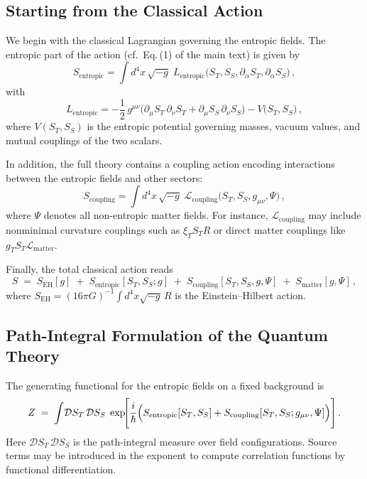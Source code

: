 \documentclass[11pt,a4paper]{article} %
\begin{document}
\subsection{Starting from the Classical Action}
We begin with the classical Lagrangian governing the entropic fields.  The entropic part of the action (cf.\ Eq.\,(1) of the main text) is given by
\begin{equation}
S_{\mathrm{entropic}}
=\int d^4x\,\sqrt{-g}\;L_{\mathrm{entropic}}\bigl(S_T,S_S,\partial_\alpha S_T,\partial_\alpha S_S\bigr)\,,
\end{equation}
with
\begin{equation}
L_{\mathrm{entropic}}
=-\frac{1}{2}\,g^{\mu\nu}\bigl(\partial_\mu S_T\,\partial_\nu S_T+\partial_\mu S_S\,\partial_\nu S_S\bigr)
-V\bigl(S_T,S_S\bigr)\,,
\end{equation}
where \(V(S_T,S_S)\) is the entropic potential governing masses, vacuum values, and mutual couplings of the two scalars.

In addition, the full theory contains a coupling action encoding interactions between the entropic fields and other sectors:
\begin{equation}
S_{\mathrm{coupling}}
=\int d^4x\,\sqrt{-g}\;\mathcal{L}_{\mathrm{coupling}}\bigl(S_T,S_S,g_{\mu\nu},\Psi\bigr)\,,
\end{equation}
where \(\Psi\) denotes all non-entropic matter fields.  For instance, \(\mathcal{L}_{\mathrm{coupling}}\) may include nonminimal curvature couplings such as \(\xi_T S_T R\) or direct matter couplings like \(g_T S_T\mathcal{L}_{\mathrm{matter}}\).

Finally, the total classical action reads
\begin{equation}
S \;=\; S_{\mathrm{EH}}[g] \;+\; S_{\mathrm{entropic}}[S_T,S_S;g]
\;+\; S_{\mathrm{coupling}}[S_T,S_S,g,\Psi]
\;+\; S_{\mathrm{matter}}[g,\Psi]\,,
\end{equation}
where \(S_{\mathrm{EH}}=(16\pi G)^{-1}\!\int d^4x\sqrt{-g}\,R\) is the Einstein–Hilbert action.

\subsection{Path-Integral Formulation of the Quantum Theory}
The generating functional for the entropic fields on a fixed background is
\begin{equation}
Z \;=\;\int\!\mathcal{D}S_T\,\mathcal{D}S_S\;\exp\!\Biggl[\frac{i}{\hbar}\Bigl(
S_{\mathrm{entropic}}[S_T,S_S]
+S_{\mathrm{coupling}}[S_T,S_S;g_{\mu\nu},\Psi]\Bigr)\Biggr]\,.
\end{equation}
Here \(\mathcal{D}S_T\,\mathcal{D}S_S\) is the path-integral measure over field configurations.  Source terms may be introduced in the exponent to compute correlation functions by functional differentiation.
\end{document}
